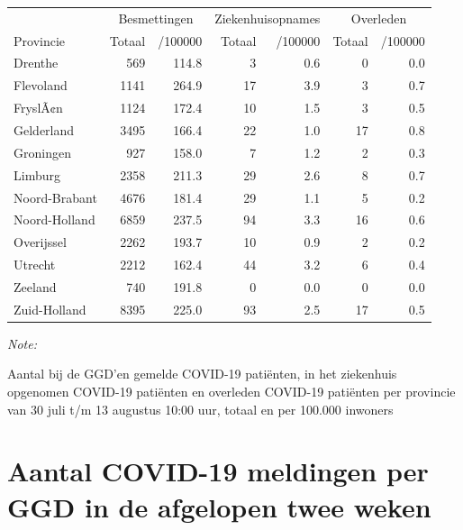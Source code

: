 \documentclass[
  english,
  man,floatsintext]{apa6}
\begin{document}
\begin{table}
\centering
\begin{threeparttable}
\begin{tabular}{lrrrrrr}
\toprule
\multicolumn{1}{c}{ } & \multicolumn{2}{c}{Besmettingen} & \multicolumn{2}{c}{Ziekenhuisopnames} & \multicolumn{2}{c}{Overleden} \\
\cmidrule(l{3pt}r{3pt}){2-3} \cmidrule(l{3pt}r{3pt}){4-5} \cmidrule(l{3pt}r{3pt}){6-7}
Provincie & Totaal & /100000 & Totaal & /100000 & Totaal & /100000\\
\midrule
Drenthe & 569 & 114.8 & 3 & 0.6 & 0 & 0.0\\
Flevoland & 1141 & 264.9 & 17 & 3.9 & 3 & 0.7\\
FryslÃ¢n & 1124 & 172.4 & 10 & 1.5 & 3 & 0.5\\
Gelderland & 3495 & 166.4 & 22 & 1.0 & 17 & 0.8\\
Groningen & 927 & 158.0 & 7 & 1.2 & 2 & 0.3\\
Limburg & 2358 & 211.3 & 29 & 2.6 & 8 & 0.7\\
Noord-Brabant & 4676 & 181.4 & 29 & 1.1 & 5 & 0.2\\
Noord-Holland & 6859 & 237.5 & 94 & 3.3 & 16 & 0.6\\
Overijssel & 2262 & 193.7 & 10 & 0.9 & 2 & 0.2\\
Utrecht & 2212 & 162.4 & 44 & 3.2 & 6 & 0.4\\
Zeeland & 740 & 191.8 & 0 & 0.0 & 0 & 0.0\\
Zuid-Holland & 8395 & 225.0 & 93 & 2.5 & 17 & 0.5\\
\bottomrule
\end{tabular}
\begin{tablenotes}
\item \textit{Note: } 
\item Aantal bij de GGD’en gemelde COVID-19 patiënten, in het ziekenhuis opgenomen COVID-19 patiënten en overleden COVID-19 patiënten per provincie van 30 juli t/m 13 augustus 10:00 uur, totaal en per 100.000 inwoners
\end{tablenotes}
\end{threeparttable}
\end{table}

\newpage

\hypertarget{aantal-covid-19-meldingen-per-ggd-in-de-afgelopen-twee-weken}{%
\section{Aantal COVID-19 meldingen per GGD in de afgelopen twee weken}\label{aantal-covid-19-meldingen-per-ggd-in-de-afgelopen-twee-weken}}
\end{document}
